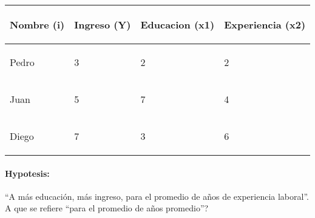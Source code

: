\documentclass[10pt]{article}
\begin{document}
\begin{table}[!h]
        \centering
        
\begin{tabular}{|p{}|p{}|p{}|p{}|}
\hline 
 \begin{center}
\textbf{Nombre (i)}
\end{center}
 & \begin{center}
\textbf{Ingreso (Y)}
\end{center}
 & \begin{center}
\textbf{Educacion (x1)}
\end{center}
 & \begin{center}
\textbf{Experiencia (x2)}
\end{center}
 \\
\hline 
 \begin{center}
Pedro
\end{center}
 & \begin{center}
3
\end{center}
 & \begin{center}
2
\end{center}
 & \begin{center}
2
\end{center}
 \\
\hline 
 \begin{center}
Juan
\end{center}
 & \begin{center}
5
\end{center}
 & \begin{center}
7
\end{center}
 & \begin{center}
4
\end{center}
 \\
\hline 
 \begin{center}
Diego
\end{center}
 & \begin{center}
7
\end{center}
 & \begin{center}
3
\end{center}
 & \begin{center}
6
\end{center}
 \\
 \hline
\end{tabular}
        
        \end{table}


\paragraph{Hypotesis:} ``A m\'as educaci\'on, m\'as ingreso, para el promedio de a\~nos de experiencia laboral''. {\color{red}A que se refiere ``para el promedio de a\~nos promedio''?}
\end{document}
